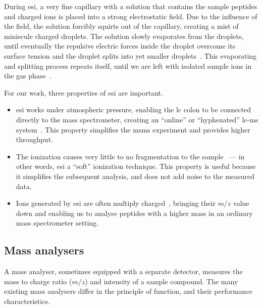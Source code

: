 During \gls*{esi}, a very fine capillary with a solution that contains the sample peptides and charged ions is placed into a strong electrostatic field. Due to the influence of the field, the solution forcibly squirts out of the capillary, creating a mist of miniscule charged droplets. The solution slowly evaporates from the droplets, until eventually the repulsive electric forces inside the droplet overcome its surface tension and the droplet splits into yet smaller droplets~\cite{rayleigh1882xx}. This evaporating and splitting process repeats itself, until we are left with isolated sample ions in the gas phase~\cite{dole1968molecular,dole1968gas,fenn1989electrospray, fenn1990electrospray}.

For our work, three properties of \gls*{esi} are important.

\begin{itemize}
  \item \gls*{esi} works under atmospheric pressure, enabling the \gls*{lc} colon to be connected directly to the mass spectrometer, creating an ``online'' or ``hyphenated'' \gls*{lc}-\gls*{ms} system~\cite{opiteck1997comprehensive}. This property simplifies the \gls*{msms} experiment and provides higher throughput.
  \item The ionization causes very little to no fragmentation to the sample~\cite{griffiths2001electrospray} --- in other words, \gls*{esi} a ``soft'' ionization technique. This property is useful because it simplifies the subsequent analysis, and does not add noise to the measured data.
  \item  Ions generated by \gls*{esi} are often multiply charged~\cite{felitsyn2002origin}, bringing their \(m/z\) value down and enabling us to analyse peptides with a higher mass in an ordinary mass spectrometer setting.
\end{itemize}

\subsection{Mass analysers}\label{sec:msms-analysis}

A mass analyser, sometimes equipped with a separate detector, measures the mass to charge ratio (\(m/z\)) and intensity of a sample compound. The many existing mass analysers differ in the principle of function, and their performance characteristics.

